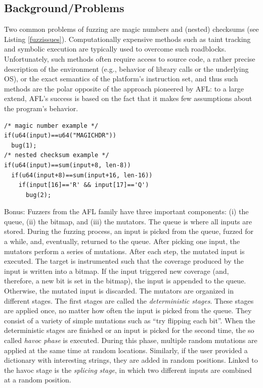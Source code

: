 \subsection{Background/Problems}
Two common problems of fuzzing are magic numbers
and (nested) checksums (see Listing \ref{fuzzissues}). Computationally expensive methods such
as taint tracking and symbolic execution are typically used to
overcome such roadblocks. Unfortunately, such methods often
require access to source code, a rather precise description of the
environment (e.g., behavior of library calls or the underlying OS),
or the exact semantics of the platform's instruction set, and thus 
such methods are the polar opposite of the approach pioneered by AFL: to a
large extend, AFL's success is based on the fact that it makes
few assumptions about the program's behavior.
\begin{lstlisting}[label=fuzzissues,language={[ANSI]C}, caption={Roadblocks for feedback-driven fuzzing.}]
/* magic number example */
if(u64(input)==u64("MAGICHDR"))
  bug(1);
/* nested checksum example */
if(u64(input)==sum(input+8, len-8))
  if(u64(input+8)==sum(input+16, len-16))
    if(input[16]=='R' && input[17]=='Q')
      bug(2);
\end{lstlisting}

Bonus:
Fuzzers from the AFL family have three important components:
(i) the queue, (ii) the bitmap, and (iii) the mutators. The queue
is where all inputs are stored. During the fuzzing process,
an input is picked from the queue, fuzzed for a while, and,
eventually, returned to the queue. After picking one input, the
mutators perform a series of mutations. After each step, the
mutated input is executed. The target is instrumented such that
the coverage produced by the input is written into a bitmap. If
the input triggered new coverage (and, therefore, a new bit
is set in the bitmap), the input is appended to the queue.
Otherwise, the mutated input is discarded. The mutators are
organized in different stages. The first stages are called the
\emph{deterministic stages}. These stages are applied once, no matter
how often the input is picked from the queue. They consist
of a variety of simple mutations such as “try flipping each
bit”. When the deterministic stages are finished or an input
is picked for the second time, the so called \emph{havoc phase} is
executed. During this phase, multiple random mutations are
applied at the same time at random locations. Similarly, if the
user provided a dictionary with interesting strings, they are
added in random positions. Linked to the havoc stage is the
\emph{splicing stage}, in which two different inputs are combined at
a random position.
